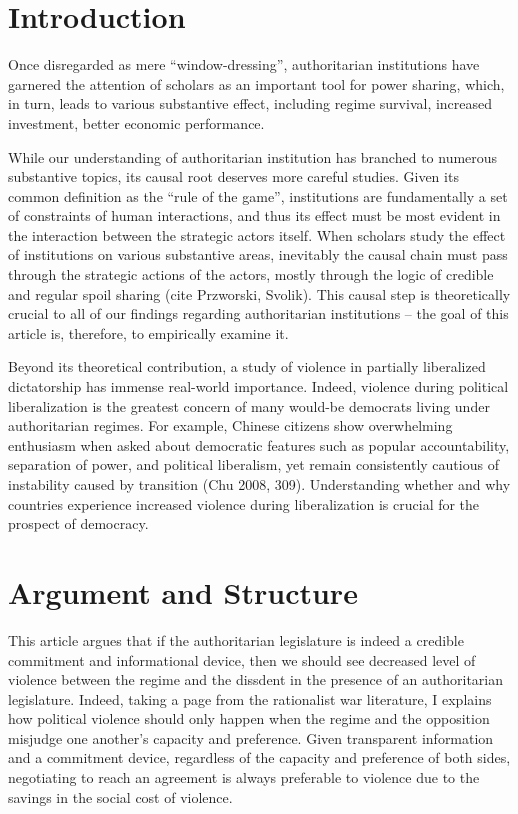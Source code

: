 \section{Introduction}

Once disregarded as mere ``window-dressing'', authoritarian institutions have garnered the attention of scholars as an important tool for power sharing, which, in turn, leads to various substantive effect, including regime survival, increased investment, better economic performance.

While our understanding of authoritarian institution has branched to numerous substantive topics, its causal root deserves more careful studies. Given its common definition as the ``rule of the game'', institutions are fundamentally a set of constraints of human interactions, and thus its effect must be most evident in the interaction between the strategic actors itself.  When scholars study the effect of institutions on various substantive areas, inevitably the causal chain must pass through the strategic actions of the actors, mostly through the logic of credible and regular spoil sharing (cite Przworski, Svolik). This causal step is theoretically crucial to all of our findings regarding authoritarian institutions – the goal of this article is, therefore, to empirically examine it.

Beyond its theoretical contribution, a study of violence in partially liberalized dictatorship has immense real-world importance. Indeed, violence during political liberalization is the greatest concern of many would-be democrats living under authoritarian regimes. For example, Chinese citizens show overwhelming enthusiasm when asked about democratic features such as popular accountability, separation of power, and political liberalism, yet remain consistently cautious of instability caused by transition (Chu 2008, 309). Understanding whether and why countries experience increased violence during liberalization is crucial for the prospect of democracy.

\section{Argument and Structure}

This article argues that if the authoritarian legislature is indeed a credible commitment and informational device, then we should see decreased level of violence between the regime and the dissdent in the presence of an authoritarian legislature. Indeed, taking a page from the rationalist war literature, I explains how political violence should only happen when the regime and the opposition misjudge one another's capacity and preference. Given transparent information and a commitment device, regardless of the capacity and preference of both sides, negotiating to reach an agreement is always preferable to violence due to the savings in the social cost of violence.

